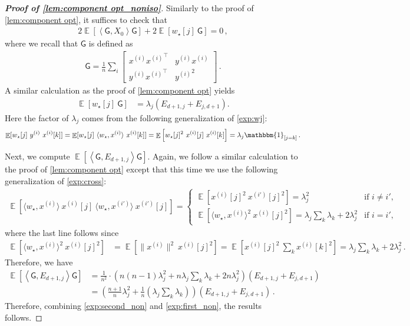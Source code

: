 \documentclass{article}
\DeclareMathOperator{\E}{\mathbb{E}}
\newcommand{\wstar}{w_\star}
\newcommand{\tx}[1]{x^{(#1)}}
\newcommand{\ty}[1]{y^{(#1)}}
\newcommand{\MM}{\mathsf{G}}
\newcommand{\inp}[2]{\left \langle #1,#2\right\rangle}
\begin{document}
\begin{proof}[{\bf Proof of \autoref{lem:component opt_noniso}}] 
Similarly to the proof of \autoref{lem:component opt}, it suffices to check that  
\begin{align}
2\E \left[ \inp{\MM}{X_0} \MM \right] + 2 \E \left[\wstar[j] \ 
\MM \right]=0\,,
\end{align}
where we recall that $\MM$ is defined as  
\begin{align}
\MM = \frac{1}{n}\sum_i\begin{bmatrix}
\tx{i} {\tx{i}}^\top & \ty{i} \tx{i}\\
\ty{i} {\tx{i}}^\top & {\ty{i}}^2
\end{bmatrix}\,.
\end{align}
A similar calculation as the proof of \autoref{lem:component opt} yields  
\begin{align} \label{exp:second_non}
\E\left[\wstar[j] \ \MM\right] &=  \lambda_j (E_{d+1,j} + E_{j,d+1}).
\end{align}
Here the factor of $\lambda_j$ comes from the following generalization of \eqref{exp:wj}:
\begin{align}
\E[\wstar[j] \ {\ty{i}} \ {\tx{i}}[k]] =\E[\wstar[j]  \ \langle{\wstar}, \tx{i} \rangle  \ {\tx{i}}[k]] =   \E\left[ \wstar[j]^2 \ {\tx{i}}[j] \ {\tx{i}}[k] \right]  = \lambda_j \mathbbm{1}_{[j=k]}\,.
\end{align}

Next, we compute $\E \left[ \inp{\MM}{E_{d+1,j}} \MM \right]$.
Again, we follow a similar calculation to the proof of \autoref{lem:component opt} except that this time we use the following generalization of 
\eqref{exp:cross}:
\begin{align}
\E\left[\langle{\wstar}, \tx{i} \rangle \ {\tx{i}}[j] \ \langle \wstar,{\tx{i'}} \rangle  \ \tx{i'} [j] \right] = \begin{cases}
\E[{\tx{i}}[j]^2 \ \tx{i'}[j]^2]= \lambda_j^2 &\text{if }i\neq i',\\
\E\left[\langle{\wstar}, \tx{i} \rangle^2 \ {\tx{i}}[j]^2\right]= \lambda_j \sum_k \lambda_k + 2 \lambda_j^2&\text{if }i=i',
\end{cases}
\end{align}
where the last line follows since
\begin{align}
\E\left[\langle{\wstar}, \tx{i} \rangle^2 \ {\tx{i}}[j]^2\right] &= \E\left[ \|{\tx{i}}\|^2 \  {\tx{i}}[j]^2 \right] =\E\left[ {\tx{i}}[j]^2 \ \sum_k {\tx{i}}[k]^2 \right]  = \lambda_j \sum_k \lambda_k + 2 \lambda_j^2\,.
\end{align} 
Therefore, we have
\begin{align}
\E \left[ \inp{\MM}{E_{d+1,j}}  \MM \right]  &=   \frac{1}{n^2} \cdot \left( n(n-1) \lambda_j^2 +   n  \lambda_j \sum_k \lambda_k + 2 n\lambda_j^2\right)  (E_{d+1,j} + E_{j,d+1})\\
&=    \left( \frac{n+1}{n} \lambda_j^2 +    \frac{1}{n} (\lambda_j \sum_k \lambda_k  )  \right)    (E_{d+1,j} + E_{j,d+1})\,. \label{exp:first_non}
\end{align}
Therefore, combining \eqref{exp:second_non} and \eqref{exp:first_non},  
the results follows. 
\end{proof}
\end{document}
